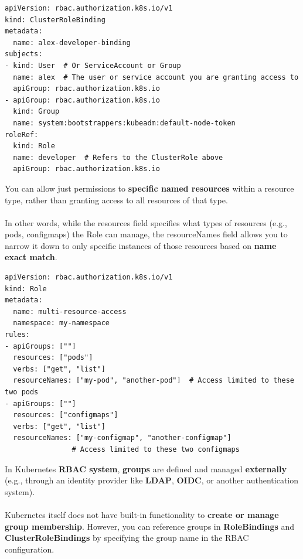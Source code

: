 \documentclass{article}
\newenvironment{blocktemplate}[1]{%
    \tcolorbox[beamer,%
    noparskip,breakable,
    colframe=Blue,%
    colbacklower=LimeGreen!75!LightGreen,%
    title=#1]}%
    {\endtcolorbox}
\newenvironment{blocktemplateI}[1]{%
    \tcolorbox[beamer,%
    noparskip,breakable,
    colframe=Violet,%
    colbacklower=Black,%
    title=#1]}%
    {\endtcolorbox}
\newenvironment{blocktemplateII}[1]{%
    \tcolorbox[beamer,%
    noparskip,breakable,
    colframe=Green,%
    colbacklower=LimeGreen!75!LightGreen,%
    title=#1]}%
    {\endtcolorbox}
\newenvironment{codetemplate}[1][]{%
  \mybasecolorbox[#1]
  \itshape
}{%
  \endmybasecolorbox
}
\begin{document}
\begin{blocktemplateII}{NOTE}
\begin{codetemplate}{}
\begin{verbatim}
apiVersion: rbac.authorization.k8s.io/v1
kind: ClusterRoleBinding
metadata:
  name: alex-developer-binding
subjects:
- kind: User  # Or ServiceAccount or Group
  name: alex  # The user or service account you are granting access to
  apiGroup: rbac.authorization.k8s.io
- apiGroup: rbac.authorization.k8s.io
  kind: Group
  name: system:bootstrappers:kubeadm:default-node-token
roleRef:
  kind: Role
  name: developer  # Refers to the ClusterRole above
  apiGroup: rbac.authorization.k8s.io
\end{verbatim}
\end{codetemplate}
\end{blocktemplateII}

\begin{blocktemplateI}{NOTE 2}
You can allow just permissions to \textbf{specific named resources} within a resource type, rather than granting access to all resources of that type.
\\\\
In other words, while the resources field specifies what types of resources (e.g., pods, configmaps) the Role can manage, the resourceNames field allows you to narrow it down to only specific instances of those resources based on \textbf{name exact match}.
\begin{codetemplate}{}
\begin{verbatim}
apiVersion: rbac.authorization.k8s.io/v1
kind: Role
metadata:
  name: multi-resource-access
  namespace: my-namespace
rules:
- apiGroups: [""]
  resources: ["pods"]
  verbs: ["get", "list"]
  resourceNames: ["my-pod", "another-pod"]  # Access limited to these two pods
- apiGroups: [""]
  resources: ["configmaps"]
  verbs: ["get", "list"]
  resourceNames: ["my-configmap", "another-configmap"]  
                # Access limited to these two configmaps
\end{verbatim}
\end{codetemplate}
\end{blocktemplateI}

\begin{blocktemplate}{NOTE 3}
In Kubernetes \textbf{RBAC system}, \textbf{groups} are defined and managed \textbf{externally} (e.g., through an identity provider like \textbf{LDAP}, \textbf{OIDC}, or another authentication system). 
\\\\
Kubernetes itself does not have built-in functionality to \textbf{create or manage group membership}. However, you can reference groups in \textbf{RoleBindings} and \textbf{ClusterRoleBindings} by specifying the group name in the RBAC configuration.
\end{blocktemplate}
\end{document}
